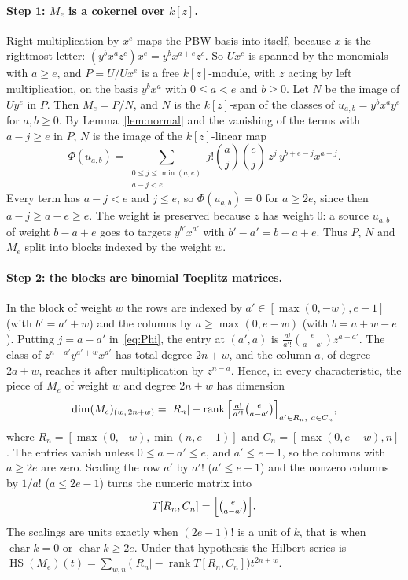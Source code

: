\documentclass[11pt]{article}
\theoremstyle{definition}
\theoremstyle{remark}
\newcommand{\Hilb}{\operatorname{HS}}
\newcommand{\ch}{\operatorname{char}}
\begin{document}
\paragraph{Step 1: $M_e$ is a cokernel over $k[z]$.} Right multiplication by $x^e$ maps the PBW basis into itself, because $x$ is the rightmost letter: $(y^bx^az^c)x^e=y^bx^{a+e}z^c$. So $Ux^e$ is spanned by the monomials with $a\ge e$, and $P=U/Ux^e$ is a free $k[z]$-module, with $z$ acting by left multiplication, on the basis $y^bx^a$ with $0\le a<e$ and $b\ge0$. Let $N$ be the image of $Uy^e$ in $P$. Then $M_e=P/N$, and $N$ is the $k[z]$-span of the classes of $u_{a,b}=y^bx^ay^e$ for $a,b\ge0$. By Lemma~\ref{lem:normal} and the vanishing of the terms with $a-j\ge e$ in $P$, $N$ is the image of the $k[z]$-linear map
\begin{equation}\label{eq:Phi}
\Phi(u_{a,b})=\sum_{\substack{0\le j\le\min(a,e)\\ a-j<e}}j!\binom aj\binom ej\,z^j\,y^{b+e-j}x^{a-j}.
\end{equation}
Every term has $a-j<e$ and $j\le e$, so $\Phi(u_{a,b})=0$ for $a\ge2e$, since then $a-j\ge a-e\ge e$. The weight is preserved because $z$ has weight $0$: a source $u_{a,b}$ of weight $b-a+e$ goes to targets $y^{b'}x^{a'}$ with $b'-a'=b-a+e$. Thus $P$, $N$ and $M_e$ split into blocks indexed by the weight $w$.

\paragraph{Step 2: the blocks are binomial Toeplitz matrices.} In the block of weight $w$ the rows are indexed by $a'\in[\max(0,-w),e-1]$ (with $b'=a'+w$) and the columns by $a\ge\max(0,e-w)$ (with $b=a+w-e$). Putting $j=a-a'$ in~\eqref{eq:Phi}, the entry at $(a',a)$ is $\frac{a!}{a'!}\binom e{a-a'}z^{a-a'}$. The class of $z^{n-a'}y^{a'+w}x^{a'}$ has total degree $2n+w$, and the column $a$, of degree $2a+w$, reaches it after multiplication by $z^{n-a}$. Hence, in every characteristic, the piece of $M_e$ of weight $w$ and degree $2n+w$ has dimension
\begin{equation}\label{eq:dimblock}
\dim(M_e)_{(w,\,2n+w)}=|R_n|-\operatorname{rank}\Big[\tfrac{a!}{a'!}\tbinom e{a-a'}\Big]_{a'\in R_n,\ a\in C_n},
\end{equation}
where $R_n=[\max(0,-w),\min(n,e-1)]$ and $C_n=[\max(0,e-w),n]$.
The entries vanish unless $0\le a-a'\le e$, and $a'\le e-1$, so the columns with $a\ge2e$ are zero. Scaling the row $a'$ by $a'!$ ($a'\le e-1$) and the nonzero columns by $1/a!$ ($a\le2e-1$) turns the numeric matrix into
\begin{equation}\label{eq:T}
T[R_n,C_n]=\Big[\tbinom e{a-a'}\Big].
\end{equation}
The scalings are units exactly when $(2e-1)!$ is a unit of $k$, that is when $\ch k=0$ or $\ch k\ge2e$. Under that hypothesis the Hilbert series is $\Hilb(M_e)(t)=\sum_{w,n}\big(|R_n|-\operatorname{rank}T[R_n,C_n]\big)t^{2n+w}$.
\end{document}
